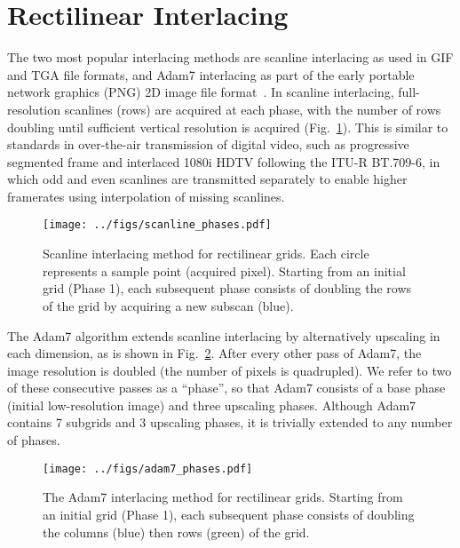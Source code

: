 \documentclass{article}
\newcommand{\reffig}[1]{Fig.~\ref{fig:#1}}
\begin{document}


\section{Rectilinear Interlacing}
\label{sec:rect}

The two most popular interlacing methods are scanline interlacing as used in GIF and TGA file formats, and Adam7 interlacing as part of the early portable network graphics (PNG) 2D image file format~\citep{rfc2083}.
%
In scanline interlacing, full-resolution scanlines (rows) are acquired at each
phase, with the number of rows doubling until sufficient vertical resolution is
acquired (\reffig{scanlinephases}).
%
This is similar to standards in over-the-air transmission of digital video, such
as progressive segmented frame and interlaced 1080i HDTV following the ITU-R
BT.709-6, in which odd and even scanlines are transmitted separately to enable higher
framerates using interpolation of missing scanlines.

\begin{figure}[hb]
\centering
\texttt{[image: ../figs/scanline\_phases.pdf]}
\caption{\label{fig:scanlinephases}
    Scanline interlacing method for rectilinear grids.
    Each circle represents a sample point (acquired pixel).
    Starting from an initial grid (Phase 1), each subsequent phase consists of
    doubling the rows of the grid by acquiring a new subscan (blue).
	}
\end{figure}

The Adam7 algorithm extends scanline interlacing by alternatively upscaling in
each dimension, as is shown in \reffig{adam7phases}.
%
After every other pass of Adam7, the image resolution is doubled (the number of pixels is quadrupled).
%
We refer to two of these consecutive passes as a ``phase'', so that Adam7
consists of a base phase (initial low-resolution image) and three upscaling phases.
%
Although Adam7 contains 7 subgrids and 3 upscaling phases, it is trivially extended to any number of phases.


\begin{figure}[th]
\centering
\texttt{[image: ../figs/adam7\_phases.pdf]}
\caption{\label{fig:adam7phases}
The Adam7 interlacing method for rectilinear grids.
%
	Starting from an initial grid (Phase 1), each subsequent phase consists of doubling the columns (blue) then rows (green) of the grid.
	}
\end{figure}
\end{document}
